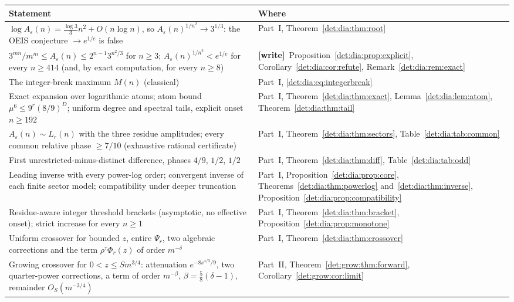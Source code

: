 \documentclass[11pt,letterpaper]{article}
\numberwithin{equation}{section}
\theoremstyle{definition}\newtheorem{definition}[theorem]{Definition}
\theoremstyle{remark}\newtheorem{remark}[theorem]{Remark}
\newcommand{\eps}{\varepsilon}
\newcommand{\wtag}{\textup{\textbf{[write]}}}
\begin{document}
\begin{center}
\small
\begin{tabular}{@{}>{\raggedright\arraybackslash}p{} >{\raggedright\arraybackslash}p{}@{}}
\toprule
Statement & Where\\
\midrule
$\log A_\eps(n)=\frac{\log3}3n^2+O(n\log n)$, so $A_\eps(n)^{1/n^2}\to3^{1/3}$: the OEIS conjecture $\to e^{1/e}$ is false & Part~I, Theorem~\ref{det:dia:thm:root}\\
$3^{mn}/m^m\le A_\eps(n)\le2^{n-1}3^{n^2/3}$ for $n\ge3$; $A_\eps(n)^{1/n^2}<e^{1/e}$ for every $n\ge414$ (and, by exact computation, for every $n\ge8$) & \wtag\ Proposition~\ref{det:dia:prop:explicit}, Corollary~\ref{det:dia:cor:refute}, Remark~\ref{det:dia:rem:exact}\\
The integer-break maximum $M(n)$ (classical) & Part~I, \eqref{det:dia:eq:integerbreak}\\
Exact expansion over logarithmic atoms; atom bound $\mu^6\le9^r(8/9)^D$; uniform degree and spectral tails, explicit onset $n\ge192$ & Part~I, Theorem~\ref{det:dia:thm:exact}, Lemma~\ref{det:dia:lem:atom}, Theorem~\ref{det:dia:thm:tail}\\
$A_\eps(n)\sim L_r(n)$ with the three residue amplitudes; every common relative phase $\ge7/10$ (exhaustive rational certificate) & Part~I, Theorem~\ref{det:dia:thm:sectors}, Table~\ref{det:dia:tab:common}\\
First unrestricted-minus-distinct difference, phases $4/9$, $1/2$, $1/2$ & Part~I, Theorem~\ref{det:dia:thm:diff}, Table~\ref{det:dia:tab:odd}\\
Leading inverse with every power-log order; convergent inverse of each finite sector model; compatibility under deeper truncation & Part~I, Proposition~\ref{det:dia:prop:core}, Theorems~\ref{det:dia:thm:powerlog} and~\ref{det:dia:thm:inverse}, Proposition~\ref{det:dia:prop:compatibility}\\
Residue-aware integer threshold brackets (asymptotic, no effective onset); strict increase for every $n\ge1$ & Part~I, Theorem~\ref{det:dia:thm:bracket}, Proposition~\ref{det:dia:prop:monotone}\\
Uniform crossover for bounded $z$, entire $\Psi_r$, two algebraic corrections and the term $\rho^\tau\Phi_r(z)$ of order $m^{-\delta}$ & Part~I, Theorem~\ref{det:dia:thm:crossover}\\
Growing crossover for $0<z\le Sm^{3/4}$: attenuation $e^{-8s^{4/3}/9}$, two quarter-power corrections, a term of order $m^{-\beta}$, $\beta=\frac58(\delta-1)$, remainder $O_S(m^{-3/4})$ & Part~II, Theorem~\ref{det:grow:thm:forward}, Corollary~\ref{det:grow:cor:limit}\\

\end{tabular}
\end{center}
\end{document}
